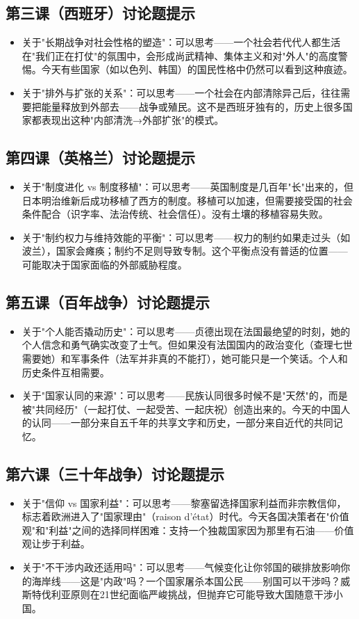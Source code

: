\documentclass[a4paper,12pt]{ctexart}
\begin{document}
\subsection*{第三课（西班牙）讨论题提示}
\begin{itemize}
  \item 关于"长期战争对社会性格的塑造"：可以思考——一个社会若代代人都生活在"我们正在打仗"的氛围中，会形成尚武精神、集体主义和对"外人"的高度警惕。今天有些国家（如以色列、韩国）的国民性格中仍然可以看到这种痕迹。
  \item 关于"排外与扩张的关系"：可以思考——一个社会在内部清除异己后，往往需要把能量释放到外部去——战争或殖民。这不是西班牙独有的，历史上很多国家都表现出这种"内部清洗→外部扩张"的模式。
\end{itemize}

\subsection*{第四课（英格兰）讨论题提示}
\begin{itemize}
  \item 关于"制度进化 vs 制度移植"：可以思考——英国制度是几百年"长"出来的，但日本明治维新后成功移植了西方的制度。移植可以加速，但需要接受国的社会条件配合（识字率、法治传统、社会信任）。没有土壤的移植容易失败。
  \item 关于"制约权力与维持效能的平衡"：可以思考——权力的制约如果走过头（如波兰），国家会瘫痪；制约不足则导致专制。这个平衡点没有普适的位置——可能取决于国家面临的外部威胁程度。
\end{itemize}

\subsection*{第五课（百年战争）讨论题提示}
\begin{itemize}
  \item 关于"个人能否撬动历史"：可以思考——贞德出现在法国最绝望的时刻，她的个人信念和勇气确实改变了士气。但如果没有法国国内的政治变化（查理七世需要她）和军事条件（法军并非真的不能打），她可能只是一个笑话。个人和历史条件互相需要。
  \item 关于"国家认同的来源"：可以思考——民族认同很多时候不是"天然"的，而是被"共同经历"（一起打仗、一起受苦、一起庆祝）创造出来的。今天的中国人的认同——一部分来自五千年的共享文字和历史，一部分来自近代的共同记忆。
\end{itemize}

\subsection*{第六课（三十年战争）讨论题提示}
\begin{itemize}
  \item 关于"信仰 vs 国家利益"：可以思考——黎塞留选择国家利益而非宗教信仰，标志着欧洲进入了"国家理由"（raison d'état）时代。今天各国决策者在"价值观"和"利益"之间的选择同样困难：支持一个独裁国家因为那里有石油——价值观让步于利益。
  \item 关于"不干涉内政还适用吗"：可以思考——气候变化让你邻国的碳排放影响你的海岸线——这是"内政"吗？一个国家屠杀本国公民——别国可以干涉吗？威斯特伐利亚原则在21世纪面临严峻挑战，但抛弃它可能导致大国随意干涉小国。
\end{itemize}
\end{document}
